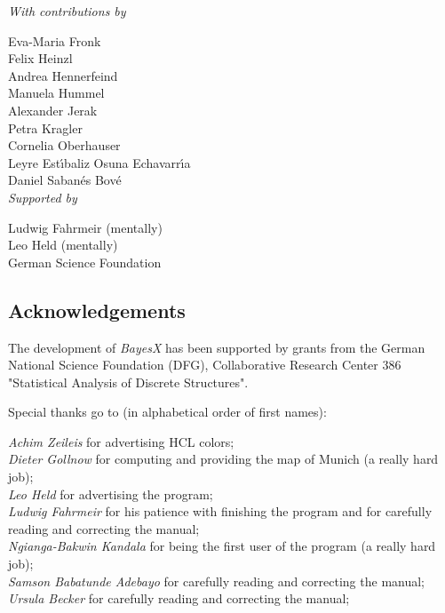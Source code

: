 \documentclass[11pt,a4paper,twoside]{bayesxreport}
\begin{document}
{\em With contributions by}

Eva-Maria Fronk\\
Felix Heinzl\\
Andrea Hennerfeind\\
Manuela Hummel\\
Alexander Jerak\\
Petra Kragler\\
Cornelia Oberhauser\\
Leyre Est\'{\i}baliz Osuna Echavarr\'{\i}a\\
Daniel Saban\'{e}s Bov\'{e}\\

{\em Supported by}

Ludwig Fahrmeir (mentally)\\
Leo Held (mentally)\\
German Science Foundation

\newpage

\subsection*{Acknowledgements}

The development of {\em BayesX} has been supported by grants from
the German National Science Foundation (DFG), Collaborative Research
Center 386 "Statistical Analysis of Discrete Structures".

Special thanks go to (in alphabetical order of first names):

{\em Achim Zeileis} for advertising HCL colors; \\
{\em Dieter Gollnow} for computing and providing the map of Munich (a really hard job); \\
{\em Leo Held} for advertising the program; \\
{\em Ludwig Fahrmeir} for his patience with finishing the program
and for carefully
reading and correcting the  manual; \\
{\em Ngianga-Bakwin Kandala} for being the first user of the program (a really hard job); \\
{\em Samson Babatunde Adebayo} for carefully reading and correcting the manual; \\
{\em Ursula Becker} for carefully reading and correcting the manual;
\end{document}

